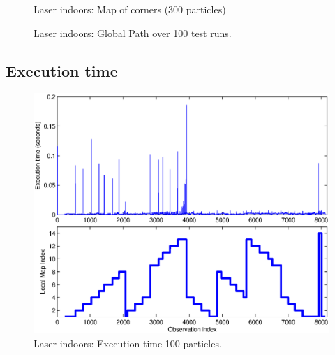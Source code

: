 \begin{figure}[htbp]
  \centering
  \caption{Laser indoors: Map of corners (300 particles)}
  \label{fig:corner_map_300p}
\end{figure}

\begin{figure}[htbp]
  \centering
  \caption{Laser indoors: Global Path over 100 test runs.}
  \label{fig:corner_odo_all}
\end{figure}


\subsection{Execution time}


\begin{figure}[htbp]
  \centering
  \includegraphics[width=15cm]{Pics/corners_execution_time}
  
  \caption{Laser indoors: Execution time 100 particles.}
  \label{fig:corners_execution_time}
\end{figure}

